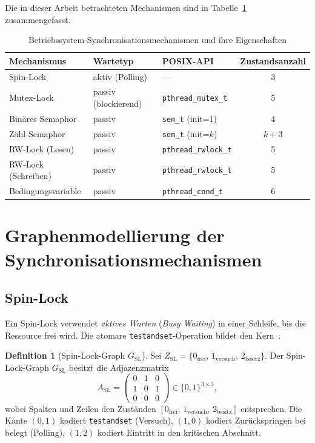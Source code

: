 ﻿\documentclass[a4paper,12pt]{article}
\theoremstyle{definition}
\newtheorem{definition}{Definition}
\begin{document}
Die in dieser Arbeit betrachteten Mechanismen sind in
Tabelle~\ref{tab:mech} zusammengefasst.

\begin{table}[H]
  \centering
  \caption{Betriebssystem-Synchronisationsmechanismen und ihre Eigenschaften}
  \label{tab:mech}
  \begin{tabular}{lllc}
    \toprule
    Mechanismus & Wartetyp & POSIX-API & Zustandsanzahl\\
    \midrule
    Spin-Lock & aktiv (Polling) & ---                       & 3 \\
    Mutex-Lock & passiv (blockierend) & \texttt{pthread\_mutex\_t} & 5 \\
    Binäres Semaphor & passiv & \texttt{sem\_t} (init=1)   & 4 \\
    Zähl-Semaphor & passiv & \texttt{sem\_t} (init=$k$)   & $k{+}3$ \\
    RW-Lock (Lesen) & passiv & \texttt{pthread\_rwlock\_t} & 5 \\
    RW-Lock (Schreiben) & passiv & \texttt{pthread\_rwlock\_t} & 5 \\
    Bedingungsvariable & passiv & \texttt{pthread\_cond\_t} & 6 \\
    \bottomrule
  \end{tabular}
\end{table}

\section{Graphenmodellierung der Syn\-chro\-ni\-sa\-tions\-me\-cha\-nis\-men}
\label{sec:modellierung}

\subsection{Spin-Lock}

Ein Spin-Lock verwendet \emph{aktives Warten} (\emph{Busy Waiting}) in einer
Schleife, bis die Ressource frei wird.
Die atomare \texttt{testandset}-Operation bildet den Kern~\cite{herlihy2008art}.

\begin{definition}[Spin-Lock-Graph $G_{\mathrm{SL}}$]
  \label{def:sl}
  Sei $Z_{\mathrm{SL}} = \{0_{\mathrm{frei}},\, 1_{\mathrm{versuch}},\, 2_{\mathrm{besitz}}\}$.
  Der Spin-Lock-Graph $G_{\mathrm{SL}}$ besitzt die Adjazenzmatrix
  \[
    A_{\mathrm{SL}} =
    \begin{pmatrix}
      0 & 1 & 0 \\
      1 & 0 & 1 \\
      0 & 0 & 0
    \end{pmatrix}
    \in \{0,1\}^{3 \times 3},
  \]
  wobei Spalten und Zeilen den Zuständen
  $[0_{\mathrm{frei}},\, 1_{\mathrm{versuch}},\, 2_{\mathrm{besitz}}]$
  entsprechen.
  Die Kante $(0, 1)$ kodiert \texttt{testandset} (Versuch),
  $(1, 0)$ kodiert Zurückspringen bei belegt (Polling),
  $(1, 2)$ kodiert Eintritt in den kritischen Abschnitt.
\end{definition}
\end{document}
